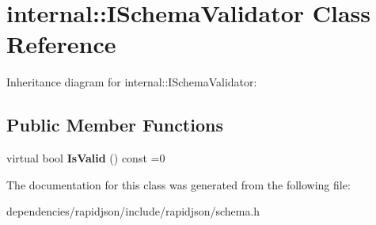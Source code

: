 \hypertarget{classinternal_1_1_i_schema_validator}{}\section{internal\+:\+:I\+Schema\+Validator Class Reference}
\label{classinternal_1_1_i_schema_validator}


Inheritance diagram for internal\+:\+:I\+Schema\+Validator\+:
\subsection*{Public Member Functions}
\begin{DoxyCompactItemize}
\item 
\mbox{\label{classinternal_1_1_i_schema_validator_a94f61f24b1447497279ef12ee0127285}} 
virtual bool {\bfseries Is\+Valid} () const =0
\end{DoxyCompactItemize}


The documentation for this class was generated from the following file\+:\begin{DoxyCompactItemize}
\item 
dependencies/rapidjson/include/rapidjson/schema.\+h\end{DoxyCompactItemize}
